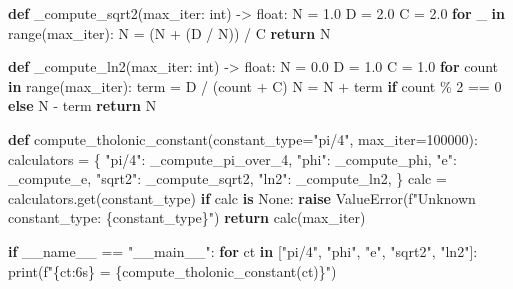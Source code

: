 \documentclass[12pt]{article}
\newenvironment{Shaded}{}{}
\newcommand{\BuiltInTok}[1]{\textcolor[rgb]{0.00,0.50,0.00}{#1}}
\newcommand{\ControlFlowTok}[1]{\textcolor[rgb]{0.00,0.44,0.13}{\textbf{#1}}}
\newcommand{\DecValTok}[1]{\textcolor[rgb]{0.25,0.63,0.44}{#1}}
\newcommand{\FloatTok}[1]{\textcolor[rgb]{0.25,0.63,0.44}{#1}}
\newcommand{\KeywordTok}[1]{\textcolor[rgb]{0.00,0.44,0.13}{\textbf{#1}}}
\newcommand{\NormalTok}[1]{#1}
\newcommand{\OperatorTok}[1]{\textcolor[rgb]{0.40,0.40,0.40}{#1}}
\newcommand{\PreprocessorTok}[1]{\textcolor[rgb]{0.74,0.48,0.00}{#1}}
\newcommand{\SpecialCharTok}[1]{\textcolor[rgb]{0.25,0.44,0.63}{#1}}
\newcommand{\SpecialStringTok}[1]{\textcolor[rgb]{0.73,0.40,0.53}{#1}}
\newcommand{\StringTok}[1]{\textcolor[rgb]{0.25,0.44,0.63}{#1}}
\newcommand{\VariableTok}[1]{\textcolor[rgb]{0.10,0.09,0.49}{#1}}
\begin{document}
\begin{Shaded}
\begin{Highlighting}[]
\KeywordTok{def}\NormalTok{ \_compute\_sqrt2(max\_iter: }\BuiltInTok{int}\NormalTok{) }\OperatorTok{{-}\textgreater{}} \BuiltInTok{float}\NormalTok{:}
\NormalTok{    N }\OperatorTok{=} \FloatTok{1.0}
\NormalTok{    D }\OperatorTok{=} \FloatTok{2.0}
\NormalTok{    C }\OperatorTok{=} \FloatTok{2.0}
    \ControlFlowTok{for}\NormalTok{ \_ }\KeywordTok{in} \BuiltInTok{range}\NormalTok{(max\_iter):}
\NormalTok{        N }\OperatorTok{=}\NormalTok{ (N }\OperatorTok{+}\NormalTok{ (D }\OperatorTok{/}\NormalTok{ N)) }\OperatorTok{/}\NormalTok{ C}
    \ControlFlowTok{return}\NormalTok{ N}


\KeywordTok{def}\NormalTok{ \_compute\_ln2(max\_iter: }\BuiltInTok{int}\NormalTok{) }\OperatorTok{{-}\textgreater{}} \BuiltInTok{float}\NormalTok{:}
\NormalTok{    N }\OperatorTok{=} \FloatTok{0.0}
\NormalTok{    D }\OperatorTok{=} \FloatTok{1.0}
\NormalTok{    C }\OperatorTok{=} \FloatTok{1.0}
    \ControlFlowTok{for}\NormalTok{ count }\KeywordTok{in} \BuiltInTok{range}\NormalTok{(max\_iter):}
\NormalTok{        term }\OperatorTok{=}\NormalTok{ D }\OperatorTok{/}\NormalTok{ (count }\OperatorTok{+}\NormalTok{ C)}
\NormalTok{        N }\OperatorTok{=}\NormalTok{ N }\OperatorTok{+}\NormalTok{ term }\ControlFlowTok{if}\NormalTok{ count }\OperatorTok{\%} \DecValTok{2} \OperatorTok{==} \DecValTok{0} \ControlFlowTok{else}\NormalTok{ N }\OperatorTok{{-}}\NormalTok{ term}
    \ControlFlowTok{return}\NormalTok{ N}


\KeywordTok{def}\NormalTok{ compute\_tholonic\_constant(constant\_type}\OperatorTok{=}\StringTok{"pi/4"}\NormalTok{, max\_iter}\OperatorTok{=}\DecValTok{100000}\NormalTok{):}
\NormalTok{    calculators }\OperatorTok{=}\NormalTok{ \{}
        \StringTok{"pi/4"}\NormalTok{:  \_compute\_pi\_over\_4,}
        \StringTok{"phi"}\NormalTok{:   \_compute\_phi,}
        \StringTok{"e"}\NormalTok{:     \_compute\_e,}
        \StringTok{"sqrt2"}\NormalTok{: \_compute\_sqrt2,}
        \StringTok{"ln2"}\NormalTok{:   \_compute\_ln2,}
\NormalTok{    \}}
\NormalTok{    calc }\OperatorTok{=}\NormalTok{ calculators.get(constant\_type)}
    \ControlFlowTok{if}\NormalTok{ calc }\KeywordTok{is} \VariableTok{None}\NormalTok{:}
        \ControlFlowTok{raise} \PreprocessorTok{ValueError}\NormalTok{(}\SpecialStringTok{f"Unknown constant\_type: }\SpecialCharTok{\{}\NormalTok{constant\_type}\SpecialCharTok{\}}\SpecialStringTok{"}\NormalTok{)}
    \ControlFlowTok{return}\NormalTok{ calc(max\_iter)}


\ControlFlowTok{if} \VariableTok{\_\_name\_\_} \OperatorTok{==} \StringTok{"\_\_main\_\_"}\NormalTok{:}
    \ControlFlowTok{for}\NormalTok{ ct }\KeywordTok{in}\NormalTok{ [}\StringTok{"pi/4"}\NormalTok{, }\StringTok{"phi"}\NormalTok{, }\StringTok{"e"}\NormalTok{, }\StringTok{"sqrt2"}\NormalTok{, }\StringTok{"ln2"}\NormalTok{]:}
        \BuiltInTok{print}\NormalTok{(}\SpecialStringTok{f"}\SpecialCharTok{\{}\NormalTok{ct}\SpecialCharTok{:6s\}}\SpecialStringTok{ = }\SpecialCharTok{\{}\NormalTok{compute\_tholonic\_constant(ct)}\SpecialCharTok{\}}\SpecialStringTok{"}\NormalTok{)}
\end{Highlighting}
\end{Shaded}
\end{document}
